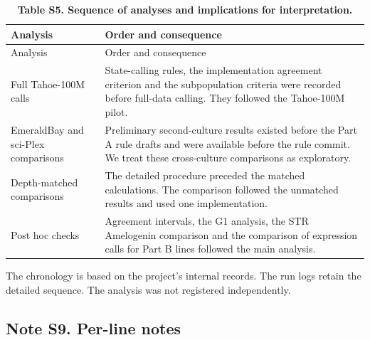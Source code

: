 \documentclass[
  11pt,
  letterpaper,
]{article}
\begin{document}
\begin{longtable}[]{@{}
  >{\raggedright\arraybackslash}p{}
  >{\raggedright\arraybackslash}p{}@{}}
\caption{\textbf{Table S5. Sequence of analyses and implications for
interpretation.}}\tabularnewline
\toprule\noalign{}
\begin{minipage}[b]{\linewidth}\raggedright
Analysis
\end{minipage} & \begin{minipage}[b]{\linewidth}\raggedright
Order and consequence
\end{minipage} \\
\midrule\noalign{}
\endfirsthead
\toprule\noalign{}
\begin{minipage}[b]{\linewidth}\raggedright
Analysis
\end{minipage} & \begin{minipage}[b]{\linewidth}\raggedright
Order and consequence
\end{minipage} \\
\midrule\noalign{}
\endhead
\bottomrule\noalign{}
\endlastfoot
Full Tahoe-100M calls & State-calling rules, the implementation
agreement criterion and the subpopulation criteria were recorded before
full-data calling. They followed the Tahoe-100M pilot. \\
EmeraldBay and sci-Plex comparisons & Preliminary second-culture results
existed before the Part A rule drafts and were available before the rule
commit. We treat these cross-culture comparisons as exploratory. \\
Depth-matched comparisons & The detailed procedure preceded the matched
calculations. The comparison followed the unmatched results and used one
implementation. \\
Post hoc checks & Agreement intervals, the G1 analysis, the STR
Amelogenin comparison and the comparison of expression calls for Part B
lines followed the main analysis. \\
\end{longtable}

The chronology is based on the project's internal records. The run logs
retain the detailed sequence. The analysis was not registered
independently.

\subsection{Note S9. Per-line notes}\label{note-s9.-per-line-notes}
\end{document}
